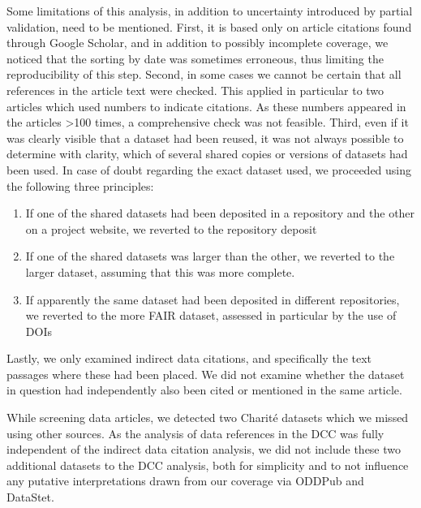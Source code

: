 \documentclass[
  letterpaper,
  DIV=11,
  numbers=noendperiod]{scrartcl}
\providecommand{\tightlist}{%
  \setlength{\itemsep}{0pt}\setlength{\parskip}{0pt}}\usepackage{longtable,booktabs,array}
\begin{document}
Some limitations of this analysis, in addition to uncertainty introduced
by partial validation, need to be mentioned. First, it is based only on
article citations found through Google Scholar, and in addition to
possibly incomplete coverage, we noticed that the sorting by date was
sometimes erroneous, thus limiting the reproducibility of this step.
Second, in some cases we cannot be certain that all references in the
article text were checked. This applied in particular to two articles
which used numbers to indicate citations. As these numbers appeared in
the articles \textgreater100 times, a comprehensive check was not
feasible. Third, even if it was clearly visible that a dataset had been
reused, it was not always possible to determine with clarity, which of
several shared copies or versions of datasets had been used. In case of
doubt regarding the exact dataset used, we proceeded using the following
three principles:

\begin{enumerate}
\def\labelenumi{\arabic{enumi}.}
\tightlist
\item
  If one of the shared datasets had been deposited in a repository and
  the other on a project website, we reverted to the repository deposit
\item
  If one of the shared datasets was larger than the other, we reverted
  to the larger dataset, assuming that this was more complete.
\item
  If apparently the same dataset had been deposited in different
  repositories, we reverted to the more FAIR dataset, assessed in
  particular by the use of DOIs
\end{enumerate}

Lastly, we only examined indirect data citations, and specifically the
text passages where these had been placed. We did not examine whether
the dataset in question had independently also been cited or mentioned
in the same article.

While screening data articles, we detected two Charité datasets which we
missed using other sources. As the analysis of data references in the
DCC was fully independent of the indirect data citation analysis, we did
not include these two additional datasets to the DCC analysis, both for
simplicity and to not influence any putative interpretations drawn from
our coverage via ODDPub and DataStet.

\vspace{16pt}

\begingroup
\setlength{\LTleft}{0pt}
\setlength{\LTright}{50pt}
\setlength{\LTpre}{12pt}
\setlength{\LTpost}{12pt}
\fontsize{8pt}{12pt}\selectfont
\end{document}
